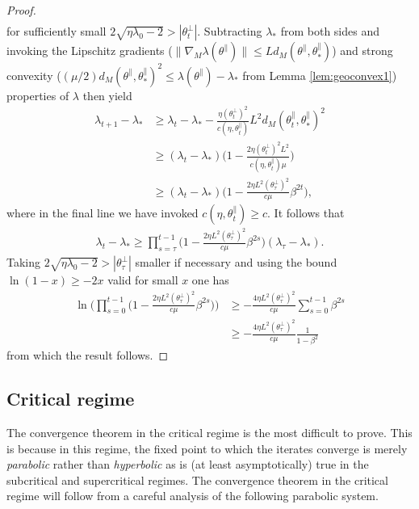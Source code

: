 \documentclass{article}
\newcommand{\tpa}{\theta^{\parallel}}
\newcommand{\tpe}{\theta^{\perp}}
\theoremstyle{plain}
\theoremstyle{definition}
\theoremstyle{remark}
\begin{document}
\begin{proof}
\begin{align}
    \end{align}
    for sufficiently small $2\sqrt{\eta\lambda_0-2}>|\tpe_t|$. Subtracting $\lambda_*$ from both sides and invoking the Lipschitz gradients ($\|\nabla_M\lambda(\tpa)\|\leq Ld_M(\tpa,\tpa_*)$) and strong convexity ($(\mu/2)d_M(\tpa,\tpa_*)^2\leq \lambda(\tpa)-\lambda_*$ from Lemma \ref{lem:geoconvex1}) properties of $\lambda$ then yield
    \begin{align}
        \lambda_{t+1}-\lambda_*&\geq \lambda_t-\lambda_*-\frac{\eta(\tpe_t)^2}{c(\eta,\tpa_t)}L^2d_M(\tpa_t,\tpa_*)^2\\&\geq (\lambda_t-\lambda_*)\bigg(1-\frac{2\eta(\tpe_t)^2L^2}{c(\eta,\tpa_t)\mu}\bigg)\\&\geq (\lambda_t-\lambda_*)\bigg(1-\frac{2\eta L^2(\tpe_{\tau})^2}{c\mu}\beta^{2t}\bigg),
    \end{align}
    where in the final line we have invoked  $c(\eta,\tpa_t)\geq c$. It follows that
    \begin{align}
        \lambda_t-\lambda_*\geq\prod_{s=\tau}^{t-1}\bigg(1-\frac{2\eta L^2(\tpe_{\tau})^2}{c\mu}\beta^{2s}\bigg)(\lambda_{\tau}-\lambda_*).
    \end{align}
    Taking $2\sqrt{\eta\lambda_0-2}>|\tpe_{\tau}|$ smaller if necessary and using the bound $\ln(1-x)\geq -2x$ valid for small $x$ one has
    \begin{align}
        \ln\bigg(\prod_{s=0}^{t-1}\bigg(1-\frac{2\eta L^2(\tpe_{\tau})^2}{c\mu}\beta^{2s}\bigg)\bigg)&\geq -\frac{4\eta L^2(\tpe_{\tau})^2}{c\mu}\sum_{s=0}^{t-1}\beta^{2s}\\&\geq -\frac{4\eta L^2(\tpe_{\tau})^2}{c\mu}\frac{1}{1-\beta^2}
    \end{align}
    from which the result follows.
\end{proof}

\subsection{Critical regime}

The convergence theorem in the critical regime is the most difficult to prove. This is because in this regime, the fixed point to which the iterates converge is merely \emph{parabolic} rather than \emph{hyperbolic} as is (at least asymptotically) true in the subcritical and supercritical regimes. The convergence theorem in the critical regime will follow from a careful analysis of the following parabolic system.
\end{document}
